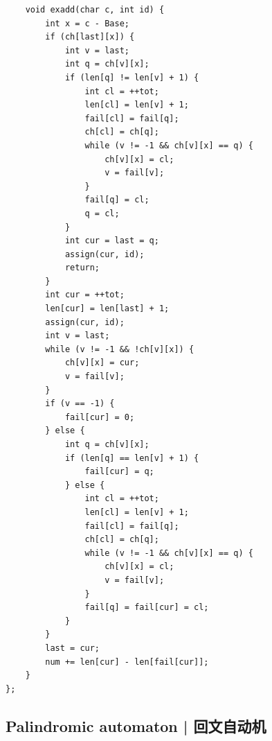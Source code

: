 \begin{lstlisting}
    void exadd(char c, int id) {
        int x = c - Base;
        if (ch[last][x]) {
            int v = last;
            int q = ch[v][x];
            if (len[q] != len[v] + 1) {
                int cl = ++tot;
                len[cl] = len[v] + 1;
                fail[cl] = fail[q];
                ch[cl] = ch[q];
                while (v != -1 && ch[v][x] == q) {
                    ch[v][x] = cl;
                    v = fail[v];
                }
                fail[q] = cl;
                q = cl;
            }
            int cur = last = q;
            assign(cur, id);
            return;
        }
        int cur = ++tot;
        len[cur] = len[last] + 1;
        assign(cur, id);
        int v = last;
        while (v != -1 && !ch[v][x]) {
            ch[v][x] = cur;
            v = fail[v];
        }
        if (v == -1) {
            fail[cur] = 0;
        } else {
            int q = ch[v][x];
            if (len[q] == len[v] + 1) {
                fail[cur] = q;
            } else {
                int cl = ++tot;
                len[cl] = len[v] + 1;
                fail[cl] = fail[q];
                ch[cl] = ch[q];
                while (v != -1 && ch[v][x] == q) {
                    ch[v][x] = cl;
                    v = fail[v];
                }
                fail[q] = fail[cur] = cl;
            }
        }
        last = cur;
        num += len[cur] - len[fail[cur]];
    }
};
    \end{lstlisting}

\subsection{Palindromic automaton | 回文自动机}


